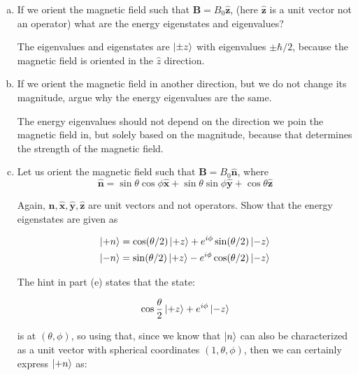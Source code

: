 \documentclass[10pt]{article}
\begin{document}
    \begin{enumerate}[(a)]
        \item If we orient the magnetic field such that $\mathbf B = B_0 \hat{\mathbf z}$, (here $\hat{\mathbf z}$ is a unit vector not an operator) what are the energy eigenstates and eigenvalues?
        
        \begin{solution}
            The eigenvalues and eigenstates are $\ket{\pm z}$ with eigenvalues $\pm \hbar/2$, because the magnetic field is oriented in the $\hat z$ direction.
        \end{solution}
        \item If we orient the magnetic field in another direction, but we do not change its magnitude, argue why the energy eigenvalues are the same. 
        
        \begin{solution}
            The energy eigenvalues should not depend on the direction we poin the magnetic field in, but solely based on the magnitude, because that determines the strength of the magnetic field. 
        \end{solution}
        \item Let us orient the magnetic field such that $\mathbf B = B_0 \hat{\mathbf n}$, where 
        \[ \hat{\mathbf n} = \sin \theta \cos \phi \hat{\mathbf x} + \sin \theta \sin \phi \hat{\mathbf y} + \cos \theta \hat{\mathbf z}\] 

        Again, $\hat{\mathbf n}, \hat{\mathbf x}, \hat{\mathbf y}, \hat{\mathbf z}$ are unit vectors and not operators. Show that the energy eigenstates are given as

        \begin{align*}
            \ket{+n} &= \cos(\theta/2) \ket{+z} + e^{i\phi} \sin(\theta/2) \ket{-z}\\
            \ket{-n} &= \sin(\theta/2) \ket{+z} - e^{i\phi}\cos(\theta/2)\ket{-z}
        \end{align*}

        \begin{solution}
            The hint in part (e) states that the state: 

            \[ \cos \frac \theta 2 \ket{+z} + e^{i \phi} \ket{-z}\] 

            is at $(\theta, \phi)$, so using that, since we know that $\ket n$ can also be characterized as a unit vector with spherical coordinates $(1, \theta, \phi)$, then we can certainly express $\ket{+n}$ as: 


\end{solution}
\end{enumerate}
\end{document}

